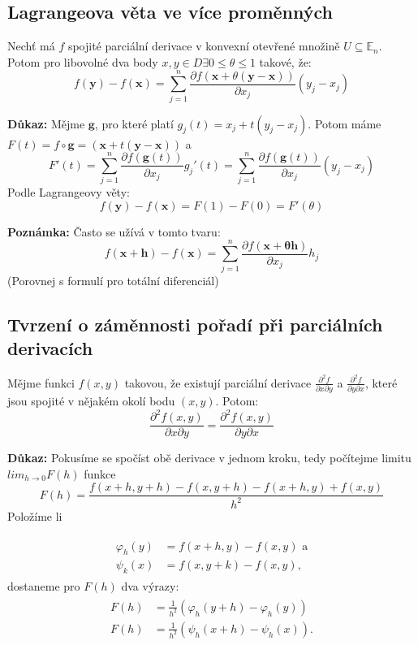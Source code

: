 \documentclass[../main.tex]{subfiles}
\begin{document}
\subsection{Lagrangeova věta ve více proměnných}
\hspace{1.2mm}
\noindent
Nechť má $f$ spojité parciální derivace v konvexní otevřené množině $U \subseteq \mathbb{E}_{n}$.
Potom pro libovolné dva body $x,y \in D \exists 0 \leq \theta \leq 1$ takové, že:
\[ f(\mathbf{y}) - f(\mathbf{x}) =
\sum^{n}_{j=1} \frac{\partial f(\mathbf{x} + \theta (\mathbf{y}-\mathbf{x}))}{\partial x_j}(y_j - x_j) \]

\noindent
\textbf{Důkaz:}
Mějme $\mathbf{g}$, pro které platí $g_j(t) = x_j + t(y_j - x_j)$.
Potom máme $F(t) = f \circ \mathbf{g} = (\mathbf{x} + t(\mathbf{y}-\mathbf{x}))$ a
\[ F'(t) = \sum^{n}_{j=1} \frac{\partial f(\mathbf{g}(t))}{\partial x_j}g_j'(t) =
\sum^{n}_{j=1} \frac{\partial f(\mathbf{g}(t))}{\partial x_j}(y_j - x_j)  \]
Podle Lagrangeovy věty:
\[ f(\mathbf{y}) - f(\mathbf{x}) = F(1) - F(0) = F'(\theta) \]

\noindent
\textbf{Poznámka:}
Často se užívá v tomto tvaru:
\[ f(\mathbf{x} + \mathbf{h}) - f(\mathbf{x}) =
\sum^{n}_{j=1} \frac{\partial f(\mathbf{x + \theta \mathbf{h}})}{\partial x_j}h_j \]
(Porovnej s formulí pro totální diferenciál)

\subsection{Tvrzení o záměnnosti pořadí při parciálních derivacích}
\hspace{1.2mm}
\noindent
Mějme funkci $f(x,y)$ takovou, že existují parciální derivace
$\frac{\partial ^2 f}{\partial x \partial y}$ a $\frac{\partial ^2 f}{\partial y \partial x}$, které
jsou spojité v nějakém okolí bodu $(x,y)$. Potom:
\[ \frac{\partial ^2 f(x,y)}{\partial x \partial y} = \frac{\partial ^2 f(x,y)}{\partial y \partial x} \]

\noindent
\textbf{Důkaz:} Pokusíme se spočíst obě derivace v jednom kroku, tedy počítejme limitu $lim_{h\rightarrow 0} F(h)$ funkce
\[F(h) = \frac{f(x+h,y+h) - f(x,y+h) - f(x+h,y) + f(x,y)}{h^2}\]
Položíme li 

\begin{align*} 
\begin{split}
\varphi_h(y) & = f(x+h,y) - f(x,y)\text{ a}\\
\psi_k(x) & = f(x,y+k) - f(x,y),
\end{split}
\end{align*}
dostaneme pro $F(h)$ dva výrazy:
\begin{align*} 
\begin{split}
F(h) & = \frac{1}{h^2} (\varphi_h(y+h) - \varphi_h(y))\\
F(h) & = \frac{1}{h^2} (\psi_h(x+h)-\psi_h(x)).
\end{split}
\end{align*}
\end{document}
